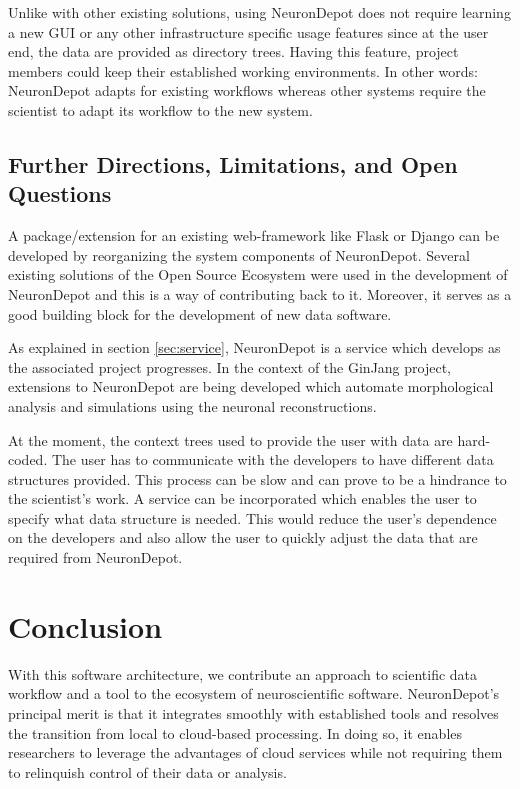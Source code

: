 \documentclass{frontiersSCNS} %
\begin{document}
Unlike with other existing solutions, using NeuronDepot does not require
learning a new GUI or any other infrastructure specific usage features since at
the user end, the data are provided as directory trees. Having this feature,
project members could keep their established working environments. In other
words: NeuronDepot adapts for existing workflows whereas other systems require
the scientist to adapt its workflow to the new system.

\subsection{Further Directions, Limitations, and Open Questions}

A package/extension for an existing web-framework like Flask or Django can be
developed by reorganizing the system components of NeuronDepot. Several
existing solutions of the Open Source Ecosystem were used in the development of
NeuronDepot and this is a way of contributing back to it. Moreover, it
serves as a good building block for the development of new data software.

As explained in section \ref{sec:service}, NeuronDepot is a service which
develops as the associated project progresses. In the context of the GinJang
project, extensions to NeuronDepot are being developed which automate
morphological analysis and simulations using the neuronal reconstructions.

At the moment, the context trees used to provide the user with data are
hard-coded. The user has to communicate with the developers to have different
data structures provided. This process can be slow and can prove to be a
hindrance to the scientist's work. A service can be incorporated which enables
the user to specify what data structure is needed. This would reduce the user's
dependence on the developers and also allow the user to quickly adjust the data
that are required from NeuronDepot.

\section{Conclusion}
With this software architecture, we contribute an approach to scientific data
workflow and a tool to the ecosystem of neuroscientific software. NeuronDepot's
principal merit is that it integrates smoothly with established tools and
resolves the transition from local to cloud-based processing. In doing so,
it enables researchers to leverage the advantages of cloud services while not
requiring them to relinquish control of their data or analysis.
\end{document}
